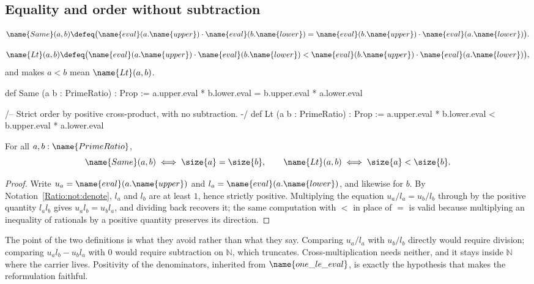 \subsection{Equality and order without subtraction}

\begin{definition}
\label{Ratio:def:same}
\[
  \name{Same}(a, b) \defeq
    \bigl(\name{eval}(a.\name{upper}) \cdot \name{eval}(b.\name{lower})
      = \name{eval}(b.\name{upper}) \cdot \name{eval}(a.\name{lower})\bigr).
\]
\end{definition}

\begin{definition}\label{Ratio:def:lt}
\[
  \name{Lt}(a, b) \defeq
    \bigl(\name{eval}(a.\name{upper}) \cdot \name{eval}(b.\name{lower})
      < \name{eval}(b.\name{upper}) \cdot \name{eval}(a.\name{lower})\bigr),
\]
and  makes $a < b$ mean $\name{Lt}(a,b)$.
\end{definition}

\begin{leancode}
def Same (a b : PrimeRatio) : Prop :=
  a.upper.eval * b.lower.eval = b.upper.eval * a.lower.eval

/-- Strict order by positive cross-product, with no subtraction. -/
def Lt (a b : PrimeRatio) : Prop :=
  a.upper.eval * b.lower.eval < b.upper.eval * a.lower.eval
\end{leancode}

\begin{proposition}
\label{Ratio:prop:cross}
For all $a, b : \name{PrimeRatio}$,
\[
  \name{Same}(a, b) \iff \size{a} = \size{b},
  \qquad
  \name{Lt}(a, b) \iff \size{a} < \size{b}.
\]
\end{proposition}

\begin{proof}
Write $u_a = \name{eval}(a.\name{upper})$ and
$l_a = \name{eval}(a.\name{lower})$, and likewise for $b$.  By
Notation~\ref{Ratio:not:denote}, $l_a$ and $l_b$ are at least $1$, hence
strictly positive.  Multiplying the equation $u_a / l_a = u_b / l_b$ through
by the positive quantity $l_a l_b$ gives $u_a l_b = u_b l_a$, and dividing
back recovers it; the same computation with $<$ in place of $=$ is valid
because multiplying an inequality of rationals by a positive quantity
preserves its direction.
\end{proof}

The point of the two definitions is what they avoid rather than what they
say.  Comparing $u_a / l_a$ with $u_b / l_b$ directly would require division;
comparing $u_a l_b - u_b l_a$ with $0$ would require subtraction on
$\mathbb{N}$, which truncates.  Cross-multiplication needs neither, and it
stays inside $\mathbb{N}$ where the carrier lives.  Positivity of the
denominators, inherited from $\name{one\_le\_eval}$, is exactly the hypothesis
that makes the reformulation faithful.


